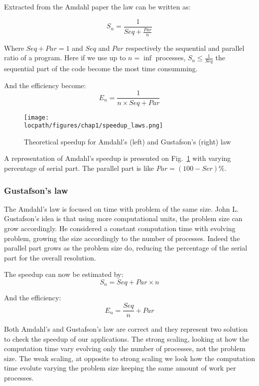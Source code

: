 Extracted from the Amdahl paper the law can be written as: 

\begin{equation}
S_n = \frac{1}{Seq + \frac{Par}{n}}
\end{equation}

Where $Seq + Par = 1$ and $Seq$ and $Par$ respectively the sequential and parallel ratio of a program.
Here if we use up to $n=\inf$ processes, $S_n \leq \frac{1}{Seq}$ the sequential part of the code become the most time consumming. 

And the efficiency become:
\begin{equation}
E_n = \frac{1}{n\times Seq + Par}
\end{equation}

\begin{figure}
\texttt{[image: \\locpath/figures/chap1/speedup\_laws.png]}
\caption{Theoretical speedup for Amdahl's (left) and Gustafson's (right) law}
\label{fig:1_HPC:speedup_laws}
\end{figure}

A representation of Amdahl's speedup is presented on Fig.~\ref{fig:1_HPC:speedup_laws} with varying percentage of serial part. 
The parallel part is like $Par = (100-Ser)\%$.

\subsubsection{Gustafson's law}
The Amdahl's law is focused on time with problem of the same size. 
John L. Gustafson's idea is that using more computational units, the problem size can grow accordingly. 
He considered a constant computation time with evolving problem, growing the size accordingly to the number of processes. 
Indeed the parallel part grows as the problem size do, reducing the percentage of the serial part for the overall resolution.

The speedup can now be estimated by:
\begin{equation}
S_n = Seq + Par \times n
\end{equation}

And the efficiency: 
\begin{equation}
E_n = \frac{Seq}{n} + Par
\end{equation}


Both Amdahl's and Gustafson's law are correct and they represent two solution to check the speedup of our applications. 
The strong scaling, looking at how the computation time vary evolving only the number of processes, not the problem size. 
The weak scaling, at opposite to strong scaling we look how the computation time evolute varying the problem size keeping the same amount of work per processes. 

